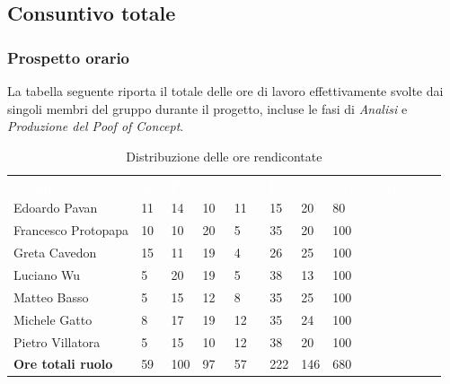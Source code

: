 


\subsection{Consuntivo totale}
\subsubsection{Prospetto orario}

La tabella seguente riporta il totale delle ore di lavoro effettivamente svolte dai singoli membri del gruppo durante il progetto, incluse le fasi di \textit{Analisi} e \textit{Produzione del Poof of Concept}.

\begin{table}[H]
	\begin{center}
	\renewcommand{\arraystretch}{1.25}
	\begin{tabular}{ m{}<{\centering}  m{}<{\centering} m{}<{\centering} m{}<{\centering}  m{}<{\centering}  m{}<{\centering}  m{}<{\centering}  m{}<{\centering}   }
		\rowcolor{darkblue}
		\textcolor{white}{\textbf{Componente}} &\textcolor{white}{\textbf{Re}}&\textcolor{white}{\textbf{Pt}}&\textcolor{white}{\textbf{An}}&\textcolor{white}{\textbf{Am}}&\textcolor{white}{\textbf{Pr}}&\textcolor{white}{\textbf{Ve}}&\textcolor{white}{\textbf{Ore complessive}}\\ 
		Edoardo Pavan & 11 & 14 & 10 & 11 & 15 & 20 & 80 \\	
		
		Francesco Protopapa & 10 & 10 & 20 & 5 & 35 & 20 & 100 \\
	
		Greta Cavedon & 15 & 11 & 19 & 4 & 26 & 25 & 100 \\
		
		Luciano Wu & 5 & 20 & 19 & 5 & 38 & 13 & 100 \\
		
		Matteo Basso & 5 & 15 & 12 & 8 & 35 & 25 & 100 \\
		
		Michele Gatto & 8 & 17 & 19 & 12 & 35 & 24 & 100 \\
		
		Pietro Villatora & 5 & 15 & 10 & 12 & 38 & 20 & 100 \\
		
		\textbf{Ore totali ruolo} & 59 & 100 & 97 & 57 & 222 & 146 & 680 \\
	
	\end{tabular}
	\caption{Distribuzione delle ore rendicontate}
	\end{center}
	\end{table}

